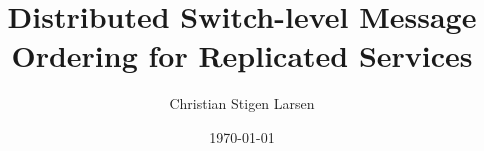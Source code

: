 \documentclass[a4paper,twoside]{report}
\begin{document}
  \author{Christian Stigen Larsen}
  \date{\today}
  \title{\textsf{Distributed Switch-level Message Ordering for Replicated
    Services}}

  \maketitle
  
  

  \listoftodos %
  \listoftables
  \listoffigures
  \listofalgorithms{}
  \lstlistoflistings{}

  \tableofcontents

  

  
  
  
  
  
  
  
  

  
  

  \appendix
    

  \clearpage %
  \printindex
  
\end{document}
